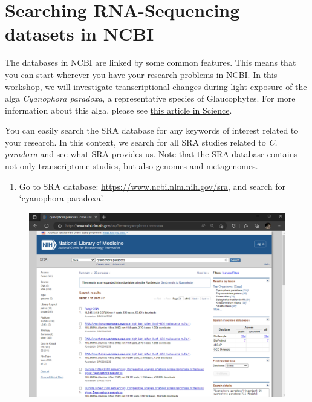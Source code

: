 \documentclass[
  letterpaper,
  DIV=11,
  numbers=noendperiod]{scrreprt}
\providecommand{\tightlist}{%
  \setlength{\itemsep}{0pt}\setlength{\parskip}{0pt}}\usepackage{longtable,booktabs,array}
\begin{document}
\hypertarget{searching-rna-sequencing-datasets-in-ncbi}{%
\section{Searching RNA-Sequencing datasets in
NCBI}\label{searching-rna-sequencing-datasets-in-ncbi}}

The databases in NCBI are linked by some common features. This means
that you can start wherever you have your research problems in NCBI. In
this workshop, we will investigate transcriptional changes during light
exposure of the alga \emph{Cyanophora paradoxa}, a representative
species of Glaucophytes. For more information about this alga, please
see \href{https://www.science.org/doi/10.1126/science.1213561}{this
article in Science}.

\begin{tcolorbox}[enhanced jigsaw, breakable, bottomrule=.15mm, left=2mm, coltitle=black, opacityback=0, colframe=quarto-callout-note-color-frame, toprule=.15mm, opacitybacktitle=0.6, colbacktitle=quarto-callout-note-color!10!white, bottomtitle=1mm, colback=white, toptitle=1mm, titlerule=0mm, rightrule=.15mm, arc=.35mm, title=\textcolor{quarto-callout-note-color}{\faInfo}\hspace{0.5em}{Activity}, leftrule=.75mm]

You can easily search the SRA database for any keywords of interest
related to your research. In this context, we search for all SRA studies
related to \emph{C. paradoxa} and see what SRA provides us. Note that
the SRA database contains not only transcriptome studies, but also
genomes and metagenomes.

\begin{enumerate}
\def\labelenumi{\arabic{enumi}.}
\tightlist
\item
  Go to SRA database: \url{https://www.ncbi.nlm.nih.gov/sra}, and search
  for `cyanophora paradoxa'.
\end{enumerate}

\begin{figure}[H]

{\centering \includegraphics{./assets/14_ncbi_sra.png}

}
\end{figure}
\end{tcolorbox}
\end{document}
